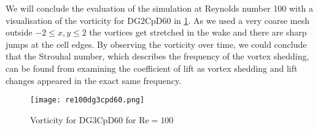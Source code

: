 		
		We will conclude the evaluation of the simulation at Reynolds number 100 with a visualisation of the vorticity for DG2CpD60 in \cref{fig:vorticity100}. As we used a very coarse mesh outside $-2\leq x,y \leq 2$ the vortices get stretched in the wake and there are sharp jumps at the cell edges. By observing the vorticity over time, we could conclude that the Strouhal number, which describes the frequency of the vortex shedding, can be found from examining the coefficient of lift as vortex shedding and lift changes appeared in the exact same frequency.
		\begin{figure}[htp]
			\centering
			\texttt{[image: re100dg3cpd60.png]}
			\caption{Vorticity for DG3CpD60 for $\text{Re} = 100$}
			\label{fig:vorticity100}
		\end{figure}
		

